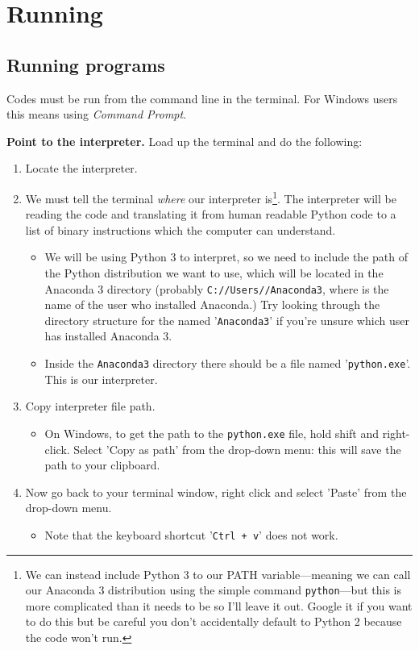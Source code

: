
\pagebreak
\section{Running}
\subsection{Running programs}

Codes must be run from the command line in the terminal. For Windows users this means using \textit{Command Prompt}.

\textbf{Point to the interpreter.} Load up the terminal and do the following:

\begin{enumerate}
\item	Locate the interpreter.
\item[]	We must tell the terminal \textit{where} our interpreter is\footnote{We can instead include Python 3 to our PATH variable---meaning we can call our Anaconda 3 distribution using the simple command \texttt{python}---but this is more complicated than it needs to be so I'll leave it out. Google it if you want to do this but be careful you don't accidentally default to Python 2 because the code won't run.}. 	The interpreter will be reading the code and translating it from human readable Python code to a list of binary instructions which the computer can understand.
 
\begin{itemize}
\item We will be using Python 3 to interpret, so we need to include the path of the Python distribution we want to use, which will be located in the Anaconda 3 directory (probably \texttt{C://Users/\user{}/Anaconda3}, where \user{} is the name of the user who installed Anaconda.) Try looking through the directory structure for the named '\texttt{Anaconda3}' if you're unsure which user has installed Anaconda 3.
\item	Inside the \texttt{Anaconda3} directory there should be a file named '\texttt{python.exe}'. This is our interpreter.
\end{itemize}

\item 	Copy interpreter file path. 
\begin{itemize}
\item[]	On Windows, to get the path to the \texttt{python.exe} file, hold shift and right-click. Select 'Copy as path' from the drop-down menu: this will save the path to your clipboard.
\end{itemize}

\item	Now go back to your terminal window, right click and select 'Paste' from the drop-down menu. 
\begin{itemize}
\item[]	Note that the keyboard shortcut '\texttt{Ctrl + v}' does not work.
\end{itemize}

\end{enumerate}

